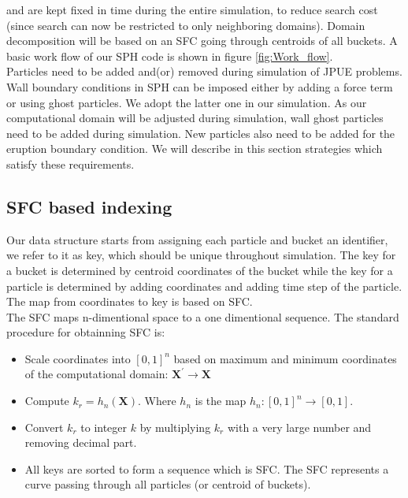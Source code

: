 \documentclass[conference,compsoc]{IEEEtran}
\begin{document}
and are kept fixed in time during the entire simulation, to reduce search cost (since search can now be restricted to only neighboring domains).
Domain decomposition will be based on an SFC going through centroids of all buckets. A basic work flow of our SPH code is shown in figure \ref{fig:Work_flow}.\\
Particles need to be added and(or) removed during simulation of JPUE problems. Wall boundary conditions in SPH can be imposed either by adding a force term or using ghost particles. We adopt the latter one in our simulation. As our computational domain will be adjusted during simulation, wall ghost particles need to be added during simulation. New particles also need to be added for the eruption boundary condition. 
We will describe in this section strategies which satisfy these requirements.
\subsection{SFC based indexing}
Our data structure starts from assigning each particle and bucket an identifier, we refer to it as key, which should be unique throughout simulation. The key for a bucket is determined by centroid coordinates of the bucket while the key for a particle is determined by adding coordinates and adding time step of the particle. The map from coordinates to key is based on SFC.\\
The SFC \cite{sagan2012space} maps n-dimentional space to a one dimentional sequence. The standard procedure for obtainning SFC is: 
\begin{itemize}
\item Scale coordinates into $[0,1]^n $ based on maximum and minimum coordinates of the computational domain: $\textbf{X}^\prime \rightarrow \textbf{X}$
\item Compute $k_r = h_n(\textbf{X})$. Where $h_n$ is the map $h_n: [0,1]^n \rightarrow [0,1]$. 
\item Convert $k_r$ to integer $k$ by multiplying $k_r$ with a very large number and removing decimal part.
\item All keys are sorted to form a sequence which is SFC. The SFC represents a curve passing through all particles (or centroid of buckets).
\end{itemize}
\end{document}
